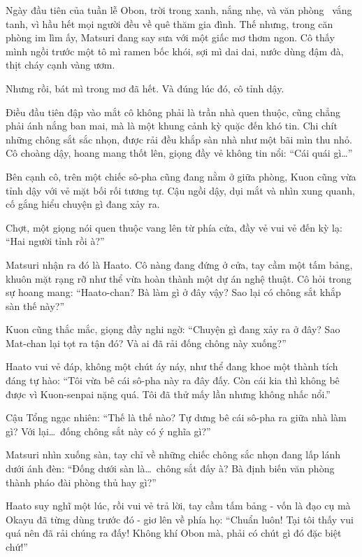 \documentclass[../main.tex]{subfiles}
\begin{document}
Ngày đầu tiên của tuần lễ Obon, trời trong xanh, nắng nhẹ, và văn phòng \hll\ vắng tanh, vì hầu hết mọi người đều về quê thăm gia đình. Thế nhưng, trong căn phòng im lìm ấy, Matsuri đang say sưa với một giấc mơ thơm ngon. Cô thấy mình ngồi trước một tô mì ramen bốc khói, sợi mì dai dai, nước dùng đậm đà, thịt cháy cạnh vàng ươm.

Nhưng rồi, bát mì trong mơ đã hết. Và đúng lúc đó, cô tỉnh dậy.

Điều đầu tiên đập vào mắt cô không phải là trần nhà quen thuộc, cũng chẳng phải ánh nắng ban mai, mà là một khung cảnh kỳ quặc đến khó tin. Chi chít những chông sắt sắc nhọn, được rải đều khắp sàn nhà như một bãi mìn thu nhỏ. Cô choàng dậy, hoang mang thốt lên, giọng đầy vẻ không tin nổi: ``Cái quái gì\dots''


Bên cạnh cô, trên một chiếc sô-pha cũng đang nằm ở giữa phòng, Kuon cũng vừa tỉnh dậy với vẻ mặt bối rối tương tự. Cậu ngồi dậy, dụi mắt và nhìn xung quanh, cố gắng hiểu chuyện gì đang xảy ra.

Chợt, một giọng nói quen thuộc vang lên từ phía cửa, đầy vẻ vui vẻ đến kỳ lạ: ``Hai người tỉnh rồi à?''

Matsuri nhận ra đó là Haato. Cô nàng đang đứng ở cửa, tay cầm một tấm bảng, khuôn mặt rạng rỡ như thể vừa hoàn thành một dự án nghệ thuật. Cô hỏi trong sự hoang mang: ``Haato-chan? Bà làm gì ở đây vậy? Sao lại có chông sắt khắp sàn thế này?''

Kuon cũng thắc mắc, giọng đầy nghi ngờ: ``Chuyện gì đang xảy ra ở đây? Sao Mat-chan lại tọt ra tận đó? Và ai đã rải đống chông này xuống?''

Haato vui vẻ đáp, không một chút áy náy, như thể đang khoe một thành tích đáng tự hào: ``Tôi vừa bê cái sô-pha này ra đây đấy. Còn cái kia thì không bê được vì Kuon-senpai nặng quá. Tôi đã thử mấy lần nhưng không nhấc nổi.''

Cậu Tổng ngạc nhiên: ``Thế là thế nào? Tự dưng bê cái sô-pha ra giữa nhà làm gì? Với lại\dots\ đống chông sắt này có ý nghĩa gì?''

Matsuri nhìn xuống sàn, tay chỉ về những chiếc chông sắc nhọn đang lấp lánh dưới ánh đèn: ``Đống dưới sàn là\dots\ chông sắt đấy à? Bà định biến văn phòng thành pháo đài phòng thủ hay gì?''

Haato suy nghĩ một lúc, rồi vui vẻ trả lời, tay cầm tấm bảng - vốn là đạo cụ mà Okayu đã từng dùng trước đó - giơ lên về phía họ: ``Chuẩn luôn! Tại tôi thấy vui quá nên đã rải chúng ra đấy! Không khí Obon mà, phải có chút gì đó đặc biệt chứ!''
\end{document}
